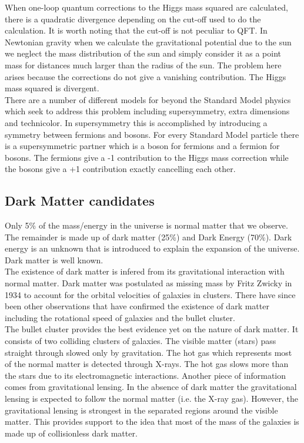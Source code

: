 When one-loop quantum corrections to the Higgs mass squared are calculated, 
there is a quadratic divergence depending on the cut-off used to do the
calculation. It is worth noting that the cut-off is not peculiar to QFT. In
Newtonian gravity when we calculate the gravitational potential due to the sun
we neglect the mass distribution of the sun and simply consider it as a point
mass for distances much larger than the radius of the sun. The problem here
arises because the corrections do not give a vanishing contribution. The Higgs
mass squared is divergent. \\

There are a number of different models for beyond the Standard Model physics 
which seek to address this problem including supersymmetry, extra dimensions 
and technicolor. In supersymmetry this is accomplished by introducing a symmetry
between fermions and bosons. For every Standard Model particle there is a 
supersymmetric partner which is a boson for fermions and a fermion for bosons. 
The fermions give a -1 contribution to the Higgs mass correction while the 
bosons give a +1 contribution exactly cancelling each other.

\subsection{Dark Matter candidates}

Only 5\% of the mass/energy in the universe is normal matter that we observe. 
The remainder is made up of dark matter (25\%) and Dark Energy (70\%). Dark
energy is an unknown that is introduced to explain the expansion of the
universe. Dark matter is well known. \\

The existence of dark matter is infered from its gravitational interaction with
normal matter. Dark matter was postulated as missing mass by Fritz Zwicky in 
1934 to account for the orbital velocities of galaxies in clusters. There have 
since been other observations that have confirmed the existence of dark matter 
including the rotational speed of galaxies and the bullet cluster. \\

The bullet cluster provides the best evidence yet on the nature of dark matter. 
It consists of two colliding clusters of galaxies. The visible matter (stars) 
pass straight through slowed only by gravitation. The hot gas which represents 
most of the normal matter is detected through X-rays. The hot gas slows more 
than the stars due to its electromagnetic interactions. Another piece of
information comes from gravitational lensing. In the absence of dark matter the
gravitational lensing is expected to follow the normal matter (i.e. the X-ray 
gas). However, the gravitational lensing is strongest in the separated regions
around the visible matter. This provides support to the idea that most of the 
mass of the galaxies is made up of collisionless dark matter. \\

